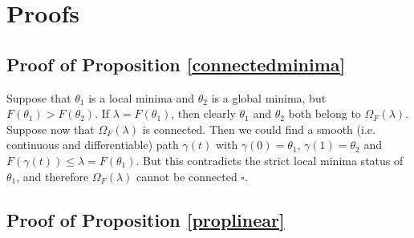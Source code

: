 \section{Proofs}

\subsection{Proof of Proposition \ref{connectedminima}}

Suppose that $\theta_1$ is a local minima and $\theta_2$ is a global minima, 
but $F(\theta_1) > F(\theta_2)$. If $\lambda = F(\theta_1)$, then clearly 
$\theta_1$ and $\theta_2$ both belong to $\Omega_F(\lambda)$. Suppose 
now that $\Omega_F(\lambda)$ 
is connected. Then we could find a smooth (i.e. continuous and differentiable) path $\gamma(t)$ 
with $\gamma(0) = \theta_1$, $\gamma(1)= \theta_2$ and $F(\gamma(t)) \leq \lambda = F(\theta_1)$.
But this contradicts the strict local minima status of $\theta_1$, and therefore $\Omega_F(\lambda)$ cannot be connected $\square$.


%


\subsection{Proof of Proposition \ref{proplinear}}

